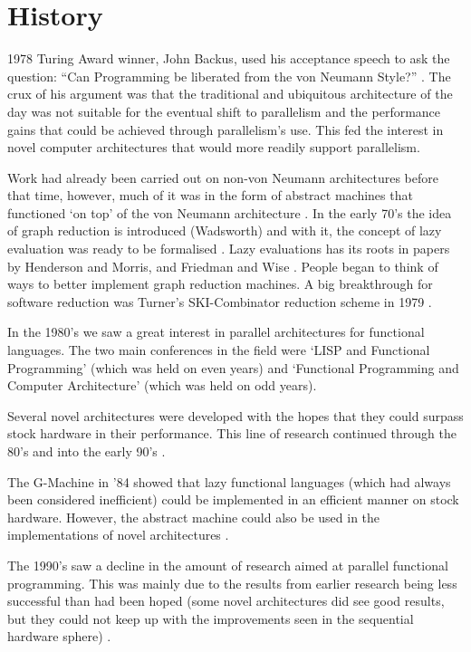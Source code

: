 \section{History}

    1978 Turing Award winner, John Backus, used his acceptance speech to ask the
question: ``Can Programming be liberated from the von Neumann Style?''
\cite{HistoryOfHaskell}. The crux of his argument was that the traditional
and ubiquitous architecture of the day was not suitable for the eventual shift
to parallelism and the performance gains that could be achieved through
parallelism's use. This fed the
interest in novel computer architectures that would more readily support
parallelism. 
 
    Work had already been carried out on non-von Neumann architectures
before that time, however, much of it was in the form of abstract machines
that functioned `on top' of the von Neumann architecture \cite{turnerHistory}.
    In the early 70's the idea of graph reduction is introduced
(Wadsworth)\cite{wadsworth} and
with it, the concept of lazy evaluation was ready to be formalised
\cite{lazyCons, HistoryOfHaskell}. Lazy
evaluations has its roots in papers by Henderson and Morris, and Friedman and
Wise \cite{turnerHistory}.
People began to think of ways to better implement graph reduction machines.
A big breakthrough for software reduction was Turner's SKI-Combinator reduction
scheme in 1979 \cite{turnerHistory, clackbook}. 

    In the 1980's we saw a great interest in parallel architectures for
functional languages. The two main conferences in the field were `LISP and
Functional Programming' (which was held on even years) and `Functional
Programming and Computer Architecture' (which was held on odd years).

    Several novel architectures were developed with the hopes that they could
surpass stock hardware in their performance. This line of research continued
through the 80's and into the early 90's \cite{Alice, GRIP, clackbook,
PFPAnIntro}.

    The G-Machine in '84 showed that lazy functional languages (which had always
been considered inefficient) could be implemented in an efficient manner on
stock hardware. However, the abstract machine could also be used in the
implementations of novel architectures \cite{Augustsson:LazyMLCompiler}. 

    The 1990's saw a decline in the amount of research aimed at parallel
functional programming. This was mainly due to the results from earlier research
being less successful than had been hoped (some novel architectures did see good
results, but they could not keep up with the improvements seen in the sequential
hardware sphere) \cite{PFPAnIntro, clackbook}. 


